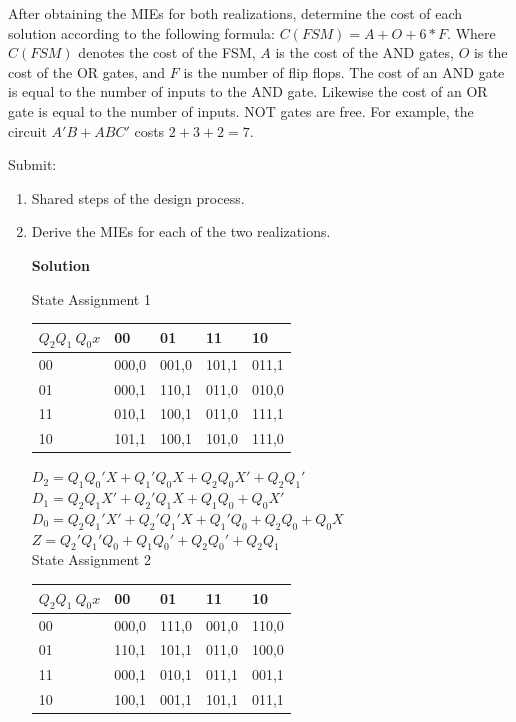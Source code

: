 \begin{enumerate}
After obtaining the MIEs for both realizations, determine the cost 
of each solution according to the following formula: 
$C(FSM) = A + O + 6*F$.  Where $C(FSM)$ denotes
the cost of the FSM, 
$A$ is the cost of the AND gates,  
$O$ is the cost of the OR gates, and 
$F$ is the number of flip flops.  
The cost of an AND gate is equal to the number of inputs to the 
AND gate.  Likewise the cost of an OR gate is equal to the number
of inputs.  NOT gates are free. For example, the circuit 
$A'B + ABC'$ costs $2+3+2=7$.  

Submit:
\begin{enumerate}
\item Shared steps of the design process.
\item Derive the MIEs for each of the two realizations.
\begin{onlysolution}  \textbf{Solution} \itshape{

State Assignment 1

\begin{tabular}{l|l|l|l|l}
$Q_2 Q_1 \ Q_0 x$  & 00 & 01  & 11 & 10 \\ \hline
00  & 000,0 & 001,0 & 101,1 & 011,1  \\ \hline
01  & 000,1 & 110,1 & 011,0 & 010,0  \\ \hline
11  & 010,1 & 100,1 & 011,0 & 111,1  \\ \hline
10  & 101,1 & 100,1 & 101,0 & 111,0  \\ 
\end{tabular}

$D_2 = Q_1Q_0'X + Q_1'Q_0X + Q_2Q_0X' + Q_2Q_1'$		\\
$D_1 = Q_2Q_1X' + Q_2'Q_1X + Q_1Q_0 + Q_0X'$			\\ 
$D_0 = Q_2Q_1'X' + Q_2'Q_1'X + Q_1'Q_0 + Q_2Q_0 + Q_0X$ 	\\    
$Z   = Q_2'Q_1'Q_0 + Q_1Q_0' + Q_2Q_0' + Q_2Q_1$		\\ 

State Assignment 2

\begin{tabular}{l|l|l|l|l}
$Q_2 Q_1 \ Q_0 x$  & 00 & 01  & 11 & 10 \\ \hline
00  & 000,0 & 111,0 & 001,0 & 110,0  \\ \hline
01  & 110,1 & 101,1 & 011,0 & 100,0  \\ \hline
11  & 000,1 & 010,1 & 011,1 & 001,1  \\ \hline
10  & 100,1 & 001,1 & 101,1 & 011,1  \\ 
\end{tabular} 

}
\end{onlysolution}
\end{enumerate}
\end{enumerate}
